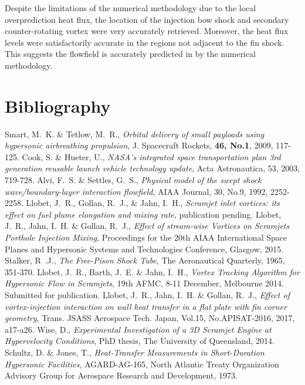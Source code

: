 \documentclass{AIAA}
\begin{document}
Despite the limitations of the numerical methodology due to the local overprediction heat flux, the location of the injection bow shock and secondary counter-rotating vortex were very accurately retrieved. Moreover, the heat flux levels were satisfactorily accurate in the regions not adjacent to the fin shock. This suggests the flowfield is accurately predicted in by the numerical methodology.


\section{Bibliography}

\begin{thebibliography}{}
Smart, M.~K. \& Tetlow, M.~R., {\it Orbital delivery of small payloads using hypersonic airbreathing propulsion}, J. Spacecraft Rockets, {\bf 46, No.1}, 2009, 117-125.
Cook, S. \& Hueter, U., {\it NASA's integrated space transportation plan 3rd generation reusable launch vehicle technology update}, Acta Astronautica, 53, 2003, 719-728.
Alvi, F.~S. \& Settles, G.~S., {\it Physical model of the swept shock wave/boundary-layer interaction flowfield}, AIAA Journal, 30, No.9, 1992, 2252-2258.
Llobet, J.~R., Gollan, R.~J., \& Jahn, I.~H., {\it Scramjet inlet vortices: its effect on fuel plume elongation and mixing rate}, publication pending.
Llobet, J.~R., Jahn, I.~H. \& Gollan, R.~J., {\it Effect of stream-wise Vortices on Scramjets Porthole Injection Mixing}, Proceedings for the 20th AIAA International Space Planes and Hypersonic Systems and Technologies Conference, Glasgow, 2015. 
Stalker, R~.J., {\it The Free-Pison Shock Tube}, The Aeronautical Quarterly, 1965, 351-370.
Llobet, J.~R., Barth, J.~E. \& Jahn, I.~H., {\it Vortex Tracking Algorithm for Hypersonic Flow in Scramjets}, 19th AFMC, 8-11 December, Melbourne 2014. Submitted for publication.
Llobet, J.~R., Jahn, I.~H. \& Gollan, R.~J., {\it Effect of vortex-injection interaction on wall heat transfer in a flat plate with fin corner geometry}, Trans. JSASS Aerospace Tech. Japan, Vol.15, No.APISAT-2016, 2017, a17-a26. 
Wise, D., {\it Experimental Investigation of a 3D Scramjet Engine at Hypervelocity Conditions}, PhD thesis, The University of Queensland, 2014.
Schultz, D. \& Jones, T., {\it Heat-Transfer Measurements in Short-Duration Hypersonic Facilities}, AGARD-AG-165, North Atlantic Treaty Organization Advisory Group for Aerospace Research and Development, 1973.

\end{thebibliography}
\end{document}
